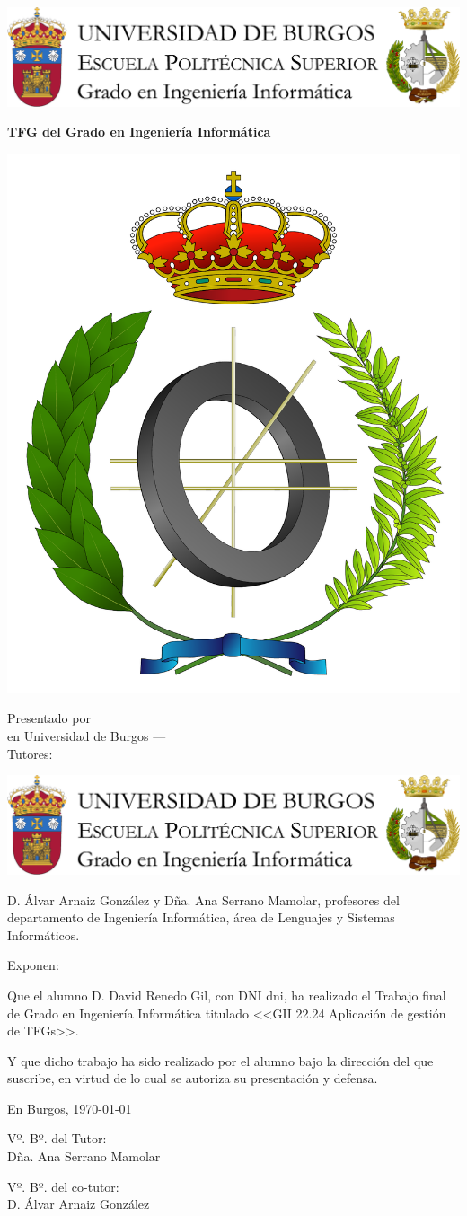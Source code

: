 \documentclass[a4paper,12pt,twoside]{memoir}
\title{\nombreTFG}
\author{\nombre}
\date{\today}
\makeatletter
\def\maketitle{
		\null
		\thispagestyle{empty}
		\noindent\includegraphics[width=\textwidth]{cabecera}\vspace{1cm}%
		\vfill
		\colorbox{cpardoBox}{%
			\begin{minipage}{.8\textwidth}
				\vspace{.5cm}\Large
				\begin{center}
					\textbf{TFG del Grado en Ingeniería Informática}\vspace{.6cm}\\
					\textbf{\LARGE\@title{}}
				\end{center}
				\vspace{.2cm}
			\end{minipage}
			
		}%
		\hfill\begin{minipage}{.20\textwidth}
			\includegraphics[width=\textwidth]{escudoInfor}
		\end{minipage}
		\vfill
		\begin{center}%
			{%
				\noindent\LARGE
				Presentado por \@author{}\\ 
				en Universidad de Burgos --- \@date{}\\
				Tutores: \@tutor{}\\
			}%
		\end{center}%
		\null
		\cleardoublepage
	}
\newcommand{\nombre}{David Renedo Gil} %
\makeatother
\begin{document}
		
		\maketitle
		
		
		\newpage\null\thispagestyle{empty}\newpage
		
		
		\thispagestyle{empty}
		
		
		\noindent\includegraphics[width=\textwidth]{cabecera}\vspace{1cm}
		
		\noindent D. Álvar Arnaiz  González y Dña. Ana Serrano Mamolar, profesores del departamento de Ingeniería Informática, área de Lenguajes y Sistemas Informáticos.
		
		\noindent Exponen:
		
		\noindent Que el alumno D. \nombre, con DNI dni, ha realizado el Trabajo final de Grado en Ingeniería Informática titulado <<GII 22.24 Aplicación de gestión de TFGs>>.
		
		\noindent Y que dicho trabajo ha sido realizado por el alumno bajo la dirección del que suscribe, en virtud de lo cual se autoriza su presentación y defensa.
		
		\begin{center} %
			En Burgos, {\large \today}
		\end{center}
		
		\vfill\vfill\vfill
		
		\begin{minipage}{0.45\textwidth}
			\begin{flushleft} %
				Vº. Bº. del Tutor:\\[2cm]
				Dña. Ana Serrano Mamolar
			\end{flushleft}
		\end{minipage}
		\hfill
		\begin{minipage}{0.45\textwidth}
			\begin{flushleft} %
				Vº. Bº. del co-tutor:\\[2cm]
				D. Álvar Arnaiz González
			\end{flushleft}
		\end{minipage}
		\hfill
		
\end{document}
